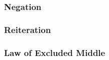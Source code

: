 \vspace{-10pt}
\hrulefill
\vspace{-10pt}
\begin{multicols}{2}
\subsubsection*{Negation}
\begin{pf}
\open
	\ellipsesline
\close
{}
\end{pf}


\vfill\null
\columnbreak

\begin{pf}
\open
	\ellipsesline
\close
{}
\end{pf}


\end{multicols} %

\vspace{-10pt}
\hrulefill
\vspace{-10pt}
\begin{multicols}{2}
\subsubsection*{Reiteration}

\begin{pf}
	 
\end{pf}

\subsubsection*{Law of Excluded Middle}
\begin{pf}
	\LEM
\end{pf}
\end{multicols}  %


